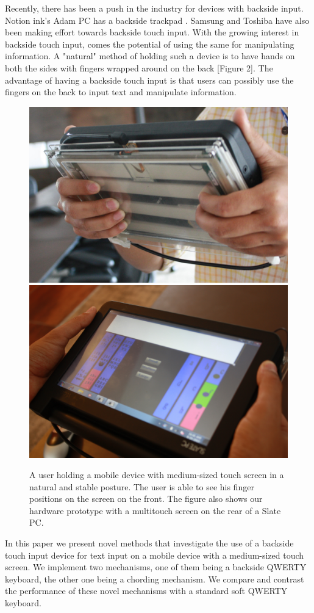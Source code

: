 Recently, there has been a push in the industry for devices with
backside input. Notion ink's Adam PC has a backside trackpad
\cite{1}. Samsung and Toshiba have also been making effort towards
backside touch input. With the growing interest in
backside touch input, comes the potential of using the same for
manipulating information. A "natural" method of holding such a device
is to have hands on both the sides with fingers wrapped around on the
back [Figure 2]. The advantage of having a backside touch input is that
users can possibly use the fingers on the back to input text and
manipulate information.
\begin{figure}
    \includegraphics[scale=0.43]{Figures/natural1.pdf} 
     \includegraphics[scale=0.43]{Figures/natural2.pdf} 
  	\caption{A user holding a mobile device with medium-sized touch screen in a natural and stable posture. The user is able to see his finger positions on the screen on the front. The figure also shows our hardware prototype with a multitouch screen on the rear of a Slate PC.}
\end{figure}
In this paper we present novel methods that investigate the use of a
backside touch input device for text input on a mobile device with a medium-sized
touch screen. We implement two mechanisms, one of them being a backside
QWERTY keyboard, the other one being a chording mechanism. We compare
and contrast the performance of these novel mechanisms with a standard
soft QWERTY keyboard.
